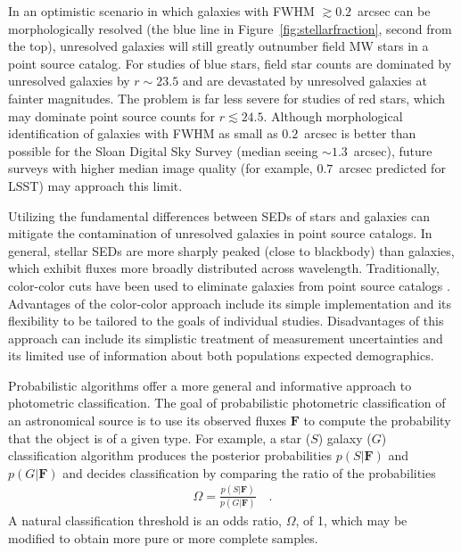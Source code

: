 \documentclass[12pt,preprint]{aastex}
\newcommand{\datavector}[1]{\boldsymbol{#1}}
\begin{document}
In an optimistic scenario in which galaxies with FWHM $\gtrsim 0.2$~arcsec can
be morphologically resolved (the blue line in
Figure~\ref{fig:stellarfraction}, second from the top), unresolved
galaxies will still greatly outnumber field MW stars in a point source
catalog.  For studies of blue stars, field star counts are dominated
by unresolved galaxies by $r\sim23.5$ and are devastated by unresolved
galaxies at fainter magnitudes. The problem is far less severe for
studies of red stars, which may dominate point source counts for
$r\lesssim24.5$. Although morphological identification of galaxies with
FWHM as small as $0.2$~arcsec is better than possible for the Sloan Digital Sky
Survey (median seeing $\sim1.3$~arcsec), future surveys with
higher median image quality (for example, $0.7$~arcsec predicted for LSST) may
approach this limit.

Utilizing the fundamental differences between SEDs of stars and
galaxies can mitigate the contamination of unresolved galaxies in
point source catalogs.  In general, stellar SEDs are more sharply
peaked (close to blackbody) than galaxies, which exhibit fluxes more
broadly distributed across wavelength.  Traditionally, color-color
cuts have been used to eliminate galaxies from point source catalogs
\citep[e.g.,][]{gould92a,reitzel98a,daddi04a}.  Advantages of the
color-color approach include its simple implementation and its
flexibility to be tailored to the goals of individual studies.
Disadvantages of this approach can include its simplistic treatment of
measurement uncertainties and its limited use of information about
both populations expected demographics.

Probabilistic algorithms offer a more general and informative approach
to photometric classification.  The goal of probabilistic photometric
classification of an astronomical source is to use its observed fluxes
$\datavector{F}$ to compute the probability that the object is of a
given type.  For example, a star ($S$) galaxy ($G$) classification
algorithm produces the posterior probabilities $p(S|\datavector{F})$ and
$p(G|\datavector{F})$ and decides classification by comparing the
ratio of the probabilities
\begin{eqnarray}\displaystyle
\Omega = \frac{p(S|\datavector{F})}{p(G|\datavector{F})} 
\quad .
\label{eqn:oddsratio}
\end{eqnarray}
A natural classification threshold is an odds ratio,
$\Omega$, of 1, which may be modified to obtain more pure or more
complete samples.
\end{document}
